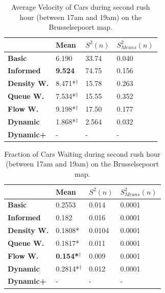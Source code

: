 \documentclass[11pt]{article}
\begin{document}
\begin{appendix}
\begin{table}[h]
\centering
\caption{Average Velocity of Cars during second rush hour (between 17am and 19am) on the Brusselsepoort map.}
\label{my-label}
\begin{tabular}{l|l|l|l|}
\textbf{}                 & \textbf{Mean} & \textbf{$S^2(n)$} & \textbf{$S_{Means}^2(n)$} \\
\hline\textbf{Basic}            & 6.190          & 33.74             & 0.040                      \\
\textbf{Informed}         & \textbf{9.524} & 74.75             & 0.156                      \\
\hline\textbf{Density W.} & 8.471*$^\dagger$          & 15.78             & 0.263                      \\
\textbf{Queue W.}   & 7.534*$^\dagger$          & 15.55             & 0.352                      \\
\textbf{Flow W.}    & 9.198*$^\dagger$          & 17.50             & 0.177                      \\
\textbf{Dynamic}          & 1.868*$^\dagger$          & 2.564             & 0.032                      \\
\textbf{Dynamic+}         & -              & -                 & -                         
\end{tabular}
\end{table}

\begin{table}[h]
\centering
\caption{Fraction of Cars Waiting during second rush hour (between 17am and 19am) on the Brusselsepoort map.}
\label{my-label}
\begin{tabular}{l|l|l|l|}
\textbf{}                 & \textbf{Mean} & \textbf{$S^2(n)$} & \textbf{$S_{Means}^2(n)$} \\
\hline\textbf{Basic}      & 0.2553         & 0.014             & 0.0001                     \\
\textbf{Informed}   & 0.182          & 0.016             & 0.0001                     \\
\hline\textbf{Density W.} & 0.1808*         & 0.0104            & 0.0001                     \\
\textbf{Queue W.}   & 0.1817*         & 0.011             & 0.0001                     \\
\textbf{Flow W.}    & \textbf{0.154*$^\dagger$} & 0.009             & 0.0001                     \\
\textbf{Dynamic}    & 0.2814*$^\dagger$         & 0.012             & 0.0001                     \\
\textbf{Dynamic+}   & -              & -                 & -                         
\end{tabular}
\end{table}


\end{appendix}
\end{document}
